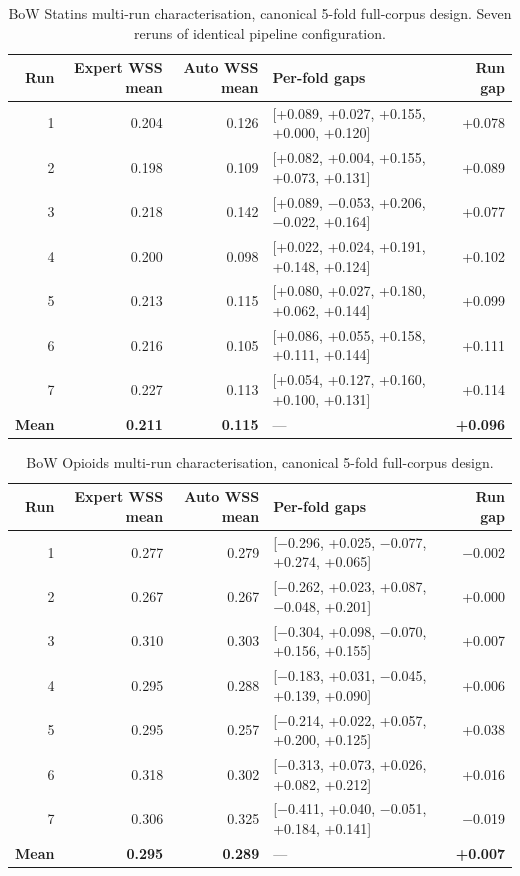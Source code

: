 \documentclass[11pt,a4paper]{article}
\begin{document}
\begin{table}[h]
\centering
\small
\begin{tabular}{rrrlr}
\toprule
Run & Expert WSS mean & Auto WSS mean & Per-fold gaps & Run gap \\
\midrule
1 & 0.204 & 0.126 & [+0.089, +0.027, +0.155, +0.000, +0.120] & +0.078 \\
2 & 0.198 & 0.109 & [+0.082, +0.004, +0.155, +0.073, +0.131] & +0.089 \\
3 & 0.218 & 0.142 & [+0.089, $-$0.053, +0.206, $-$0.022, +0.164] & +0.077 \\
4 & 0.200 & 0.098 & [+0.022, +0.024, +0.191, +0.148, +0.124] & +0.102 \\
5 & 0.213 & 0.115 & [+0.080, +0.027, +0.180, +0.062, +0.144] & +0.099 \\
6 & 0.216 & 0.105 & [+0.086, +0.055, +0.158, +0.111, +0.144] & +0.111 \\
7 & 0.227 & 0.113 & [+0.054, +0.127, +0.160, +0.100, +0.131] & +0.114 \\
\midrule
\textbf{Mean} & \textbf{0.211} & \textbf{0.115} & --- & \textbf{+0.096} \\
\bottomrule
\end{tabular}
\caption{BoW Statins multi-run characterisation, canonical 5-fold full-corpus design. Seven reruns of identical pipeline configuration.}
\label{tab:bow_statins_multirun}
\end{table}

\begin{table}[h]
\centering
\small
\begin{tabular}{rrrlr}
\toprule
Run & Expert WSS mean & Auto WSS mean & Per-fold gaps & Run gap \\
\midrule
1 & 0.277 & 0.279 & [$-$0.296, +0.025, $-$0.077, +0.274, +0.065] & $-$0.002 \\
2 & 0.267 & 0.267 & [$-$0.262, +0.023, +0.087, $-$0.048, +0.201] & +0.000 \\
3 & 0.310 & 0.303 & [$-$0.304, +0.098, $-$0.070, +0.156, +0.155] & +0.007 \\
4 & 0.295 & 0.288 & [$-$0.183, +0.031, $-$0.045, +0.139, +0.090] & +0.006 \\
5 & 0.295 & 0.257 & [$-$0.214, +0.022, +0.057, +0.200, +0.125] & +0.038 \\
6 & 0.318 & 0.302 & [$-$0.313, +0.073, +0.026, +0.082, +0.212] & +0.016 \\
7 & 0.306 & 0.325 & [$-$0.411, +0.040, $-$0.051, +0.184, +0.141] & $-$0.019 \\
\midrule
\textbf{Mean} & \textbf{0.295} & \textbf{0.289} & --- & \textbf{+0.007} \\
\bottomrule
\end{tabular}
\caption{BoW Opioids multi-run characterisation, canonical 5-fold full-corpus design.}
\label{tab:bow_opiods_multirun}
\end{table}
\end{document}
